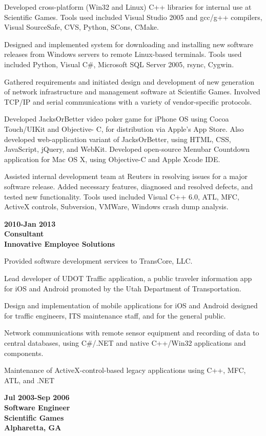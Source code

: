 Developed cross-platform (Win32 and Linux) C++ libraries for internal
use at Scientific Games. Tools used included Visual Studio 2005 and
gcc/g++ compilers, Visual SourceSafe, CVS, Python, SCons, CMake.

Designed and implemented system for downloading and installing new
software releases from Windows servers to remote Linux-based terminals.
Tools used included Python, Visual C\#, Microsoft SQL Server 2005,
rsync, Cygwin.

Gathered requirements and initiated design and development of new
generation of network infrastructure and management software at
Scientific Games. Involved TCP/IP and serial communications with a
variety of vendor-specific protocols.

Developed JacksOrBetter video poker game for iPhone OS using Cocoa
Touch/UIKit and Objective- C, for distribution via Apple's App Store.
Also developed web-application variant of JacksOrBetter, using HTML,
CSS, JavaScript, jQuery, and WebKit. Developed open-source Menubar
Countdown application for Mac OS X, using Objective-C and Apple Xcode
IDE.

Assisted internal development team at Reuters in resolving issues for a
major software release. Added necessary features, diagnosed and resolved
defects, and tested new functionality. Tools used included Visual C++
6.0, ATL, MFC, ActiveX controls, Subversion, VMWare, Windows crash dump
analysis.

\textbf{2010-Jan 2013\\
Consultant\\
Innovative Employee Solutions}

Provided software development services to TransCore, LLC.

Lead developer of UDOT Traffic application, a public traveler
information app for iOS and Android promoted by the Utah Department of
Transportation.

Design and implementation of mobile applications for iOS and Android
designed for traffic engineers, ITS maintenance staff, and for the
general public.

Network communications with remote sensor equipment and recording of
data to central databases, using C\#/.NET and native C++/Win32
applications and components.

Maintenance of ActiveX-control-based legacy applications using C++, MFC,
ATL, and .NET

\textbf{Jul 2003-Sep 2006\\
Software Engineer\\
Scientific Games\\
Alpharetta, GA}

